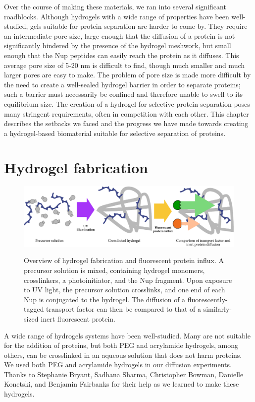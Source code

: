 Over the course of making these materials, we ran into several significant roadblocks.  Although hydrogels with a wide range of properties have been well-studied, gels suitable for protein separation are harder to come by.  They require an intermediate pore size, large enough that the diffusion of a protein is not significantly hindered by the presence of the hydrogel meshwork, but small enough that the Nup peptides can easily reach the protein as it diffuses.  This average pore size of 5-20 nm is difficult to find, though much smaller and much larger pores are easy to make.  The problem of pore size is made more difficult by the need to create a well-sealed hydrogel barrier in order to separate proteins; such a barrier must necessarily be confined and therefore unable to swell to its equilibrium size. The creation of a hydrogel for selective protein separation poses many stringent requirements, often in competition with each other.  This chapter describes the setbacks we faced and the progress we have made towards creating a hydrogel-based biomaterial suitable for selective separation of proteins.


\section{Hydrogel fabrication}
\label{sec:hydrogel-fabrication}

\begin{figure}
\caption{Overview of hydrogel fabrication and fluorescent protein influx. A precursor solution is mixed, containing hydrogel monomers, crosslinkers, a photoinitiator, and the Nup fragment.  Upon exposure to UV light, the precursor solution crosslinks, and one end of each Nup is conjugated to the hydrogel.  The diffusion of a fluorescently-tagged transport factor can then be compared to that of a similarly-sized inert fluorescent protein.}
\centering
\includegraphics[width=\textwidth]{figs/ch03/precursor}
\label{fig:precursor}
\end{figure}

A wide range of hydrogels systems have been well-studied.  Many are not suitable for the addition of proteins, but both PEG and acrylamide hydrogels, among others, can be crosslinked in an aqueous solution that does not harm proteins.  We used both PEG and acrylamide hydrogels in our diffusion experiments.  Thanks to Stephanie Bryant, Sadhana Sharma, Christopher Bowman, Danielle Konetski, and Benjamin Fairbanks for their help as we learned to make these hydrogels.


